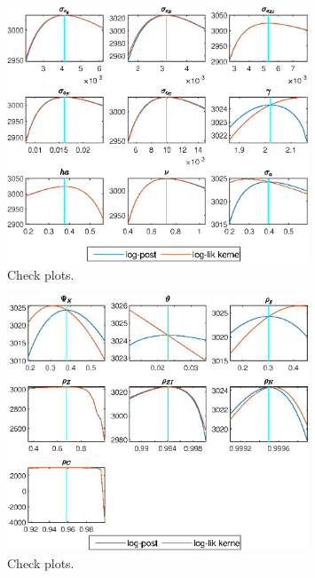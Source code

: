  
\begin{figure}[H]
\centering 
\includegraphics[width=0.80\textwidth]{RBC_growth/graphs/RBC_growth_CheckPlots1}
\caption{Check plots.}\label{Fig:CheckPlots:1}
\end{figure}
 
\begin{figure}[H]
\centering 
\includegraphics[width=0.80\textwidth]{RBC_growth/graphs/RBC_growth_CheckPlots2}
\caption{Check plots.}\label{Fig:CheckPlots:2}
\end{figure}
 
